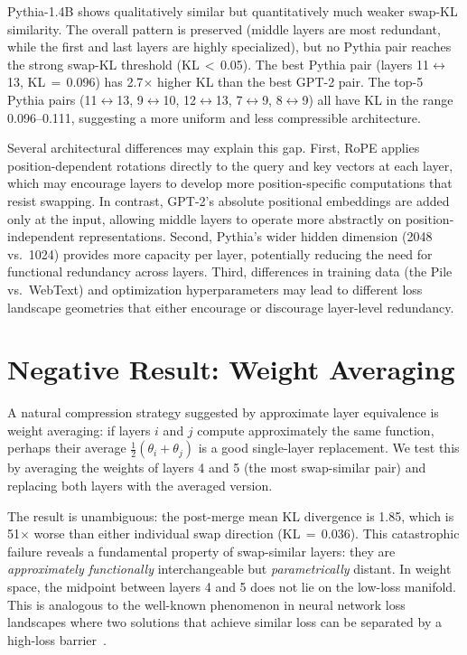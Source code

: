 \documentclass{article}
\begin{document}
Pythia-1.4B shows qualitatively similar but quantitatively much weaker swap-KL similarity. The overall pattern is preserved (middle layers are most redundant, while the first and last layers are highly specialized), but no Pythia pair reaches the strong swap-KL threshold (KL\,$<$\,0.05). The best Pythia pair (layers 11$\leftrightarrow$13, KL\,$=$\,0.096) has 2.7$\times$ higher KL than the best GPT-2 pair. The top-5 Pythia pairs (11$\leftrightarrow$13, 9$\leftrightarrow$10, 12$\leftrightarrow$13, 7$\leftrightarrow$9, 8$\leftrightarrow$9) all have KL in the range 0.096--0.111, suggesting a more uniform and less compressible architecture.

Several architectural differences may explain this gap. First, RoPE applies position-dependent rotations directly to the query and key vectors at each layer, which may encourage layers to develop more position-specific computations that resist swapping. In contrast, GPT-2's absolute positional embeddings are added only at the input, allowing middle layers to operate more abstractly on position-independent representations. Second, Pythia's wider hidden dimension (2048 vs.\ 1024) provides more capacity per layer, potentially reducing the need for functional redundancy across layers. Third, differences in training data (the Pile vs.\ WebText) and optimization hyperparameters may lead to different loss landscape geometries that either encourage or discourage layer-level redundancy.

\section{Negative Result: Weight Averaging}
\label{sec:exp_negative}
\label{sec:app_negative}

A natural compression strategy suggested by approximate layer equivalence is weight averaging: if layers $i$ and $j$ compute approximately the same function, perhaps their average $\frac{1}{2}(\theta_i + \theta_j)$ is a good single-layer replacement. We test this by averaging the weights of layers 4 and 5 (the most swap-similar pair) and replacing both layers with the averaged version.

The result is unambiguous: the post-merge mean KL divergence is 1.85, which is 51$\times$ worse than either individual swap direction (KL\,$=$\,0.036). This catastrophic failure reveals a fundamental property of swap-similar layers: they are \emph{approximately functionally} interchangeable but \emph{parametrically} distant. In weight space, the midpoint between layers 4 and 5 does not lie on the low-loss manifold. This is analogous to the well-known phenomenon in neural network loss landscapes where two solutions that achieve similar loss can be separated by a high-loss barrier~\citep{frankle2019lottery}.
\end{document}
